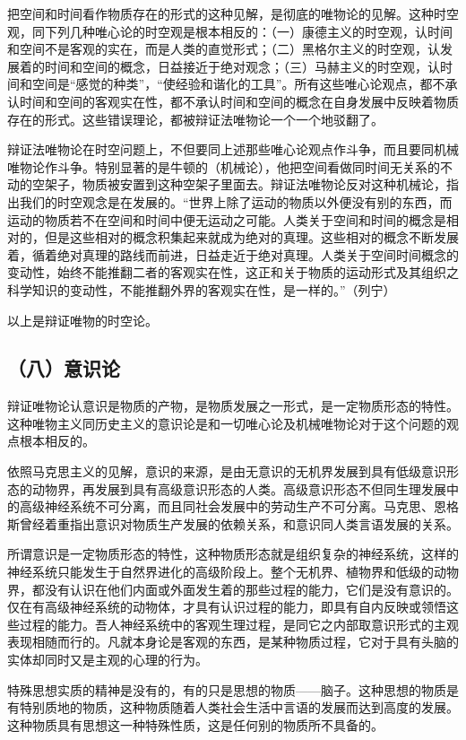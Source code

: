 把空间和时间看作物质存在的形式的这种见解，是彻底的唯物论的见解。这种时空观，同下列几种唯心论的时空观是根本相反的：（一）康德主义的时空观，认时间和空间不是客观的实在，而是人类的直觉形式；（二）黑格尔主义的时空观，认发展着的时间和空间的概念，日益接近于绝对观念；（三）马赫主义的时空观，认时间和空间是“感觉的种类”，“使经验和谐化的工具”。所有这些唯心论观点，都不承认时间和空间的客观实在性，都不承认时间和空间的概念在自身发展中反映着物质存在的形式。这些错误理论，都被辩证法唯物论一个一个地驳翻了。

辩证法唯物论在时空问题上，不但要同上述那些唯心论观点作斗争，而且要同机械唯物论作斗争。特别显著的是牛顿的（机械论），他把空间看做同时间无关系的不动的空架子，物质被安置到这种空架子里面去。辩证法唯物论反对这种机械论，指出我们的时空观念是在发展的。“世界上除了运动的物质以外便没有别的东西，而运动的物质若不在空间和时间中便无运动之可能。人类关于空间和时间的概念是相对的，但是这些相对的概念积集起来就成为绝对的真理。这些相对的概念不断发展着，循着绝对真理的路线而前进，日益走近于绝对真理。人类关于空间时间概念的变动性，始终不能推翻二者的客观实在性，这正和关于物质的运动形式及其组织之科学知识的变动性，不能推翻外界的客观实在性，是一样的。”（列宁）

以上是辩证唯物的时空论。

\subsection{（八）意识论}

辩证唯物论认意识是物质的产物，是物质发展之一形式，是一定物质形态的特性。这种唯物主义同历史主义的意识论是和一切唯心论及机械唯物论对于这个问题的观点根本相反的。

依照马克思主义的见解，意识的来源，是由无意识的无机界发展到具有低级意识形态的动物界，再发展到具有高级意识形态的人类。高级意识形态不但同生理发展中的高级神经系统不可分离，而且同社会发展中的劳动生产不可分离。马克思、恩格斯曾经着重指出意识对物质生产发展的依赖关系，和意识同人类言语发展的关系。

所谓意识是一定物质形态的特性，这种物质形态就是组织复杂的神经系统，这样的神经系统只能发生于自然界进化的高级阶段上。整个无机界、植物界和低级的动物界，都没有认识在他们内面或外面发生着的那些过程的能力，它们是没有意识的。仅在有高级神经系统的动物体，才具有认识过程的能力，即具有自内反映或领悟这些过程的能力。吾人神经系统中的客观生理过程，是同它之内部取意识形式的主观表现相随而行的。凡就本身论是客观的东西，是某种物质过程，它对于具有头脑的实体却同时又是主观的心理的行为。

特殊思想实质的精神是没有的，有的只是思想的物质——脑子。这种思想的物质是有特别质地的物质，这种物质随着人类社会生活中言语的发展而达到高度的发展。这种物质具有思想这一种特殊性质，这是任何别的物质所不具备的。

